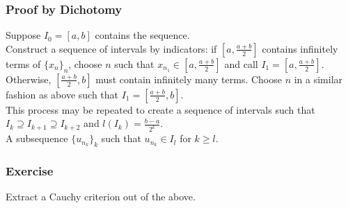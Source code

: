 \documentclass[11pt]{article}
\newcommand{\0}{\emptyset}
\begin{document}
\subsubsection*{Proof by Dichotomy}
\label{sec:org5bee109}
Suppose \(I_{0}=[a,b]\) contains the sequence.\\[0pt]
Construct a sequence of intervals by indicators: if \(\left[ a,\frac{a+b}{2} \right]\) contains infinitely terms of \(\{x_{n}\}_{n}\), choose \(n\) such that \(x_{n_{1}}\in\left[ a,\frac{a+b}{2} \right]\) and call \(I_{1}=\left[ a,\frac{a+b}{2} \right]\).\\[0pt]
Otherwise, \(\left[ \frac{a+b}{2},b \right]\) must contain infinitely many terms. Choose \(n\) in a similar fashion as above such that \(I_{1}=\left[ \frac{a+b}{2},b \right]\).\\[0pt]
This process may be repeated to create a sequence of intervals such that \(I_{k}\supseteq I_{k+1}\supseteq I_{k+2}\) and \(l(I_{k})=\frac{b-a}{2^{k}}\).\\[0pt]
A subsequence \(\{u_{n_{k}}\}_{k}\) such that \(u_{n_{k}}\in I_{l}\) for \(k\geq l\).\\[0pt]
\subsubsection*{Exercise}
\label{sec:org9f668c3}
Extract a Cauchy criterion out of the above.\\[0pt]
\end{document}
